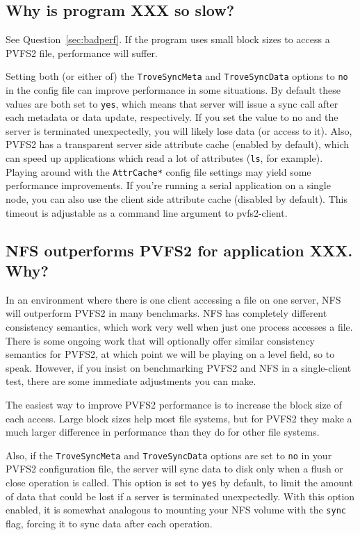 \documentclass[11pt,letterpaper]{article}
\begin{document}
\subsection{Why is program XXX so slow?}
See Question~\ref{sec:badperf}.  If the program uses small block sizes to
access a PVFS2 file, performance will suffer.  

Setting both (or either of) the \texttt{TroveSyncMeta} and
\texttt{TroveSyncData} options to \texttt{no} in the config file can
improve performance in some situations.  By default these values are
both set to \texttt{yes}, which means that server will issue a sync
call after each metadata or data update, respectively.  If you set the
value to no and the server is terminated unexpectedly, you will likely
lose data (or access to it).  Also, PVFS2 has a transparent server
side attribute cache (enabled by default), which can speed up
applications which read a lot of attributes (\texttt{ls}, for
example).  Playing around with the \texttt{AttrCache*} config file
settings may yield some performance improvements.  If you're running a
serial application on a single node, you can also use the client side
attribute cache (disabled by default).  This timeout is adjustable as
a command line argument to pvfs2-client.

\subsection{NFS outperforms PVFS2 for application XXX. Why?}

In an environment where there is one client accessing a file on one
server, NFS will outperform PVFS2 in many benchmarks.  NFS has
completely different consistency semantics, which work very well when
just one process accesses a file.  There is some ongoing work that
will optionally offer similar consistency semantics for PVFS2, at
which point we will be playing on a level field, so to speak.
However, if you insist on benchmarking PVFS2 and NFS in a
single-client test, there are some immediate adjustments you can make.

The easiest way to improve PVFS2 performance is to increase the block
size of each access.  Large block sizes help most file systems, but
for PVFS2 they make a much larger difference in performance than they
do for other file systems.

Also, if the \texttt{TroveSyncMeta} and \texttt{TroveSyncData} options
are set to \texttt{no} in your PVFS2 configuration file, the server
will sync data to disk only when a flush or close operation is called.
This option is set to \texttt{yes} by default, to limit the amount of
data that could be lost if a server is terminated unexpectedly.  With
this option enabled, it is somewhat analogous to mounting your NFS
volume with the \texttt{sync} flag, forcing it to sync data after each
operation.
\end{document}
